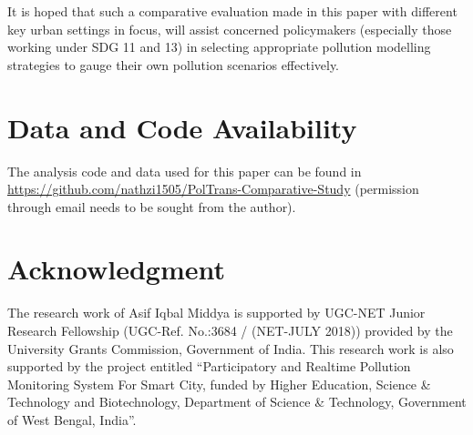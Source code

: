 \documentclass[10pt,journal]{IEEEtran}
\begin{document}
It is hoped that such a comparative evaluation made in this paper with different key urban settings in focus, will assist concerned policymakers (especially those working under SDG 11 and 13) in selecting appropriate pollution modelling strategies to gauge their own pollution scenarios effectively. 

\section*{Data and Code Availability}
The analysis code and data used for this paper can be found in \url{https://github.com/nathzi1505/PolTrans-Comparative-Study} (permission through email needs to be sought from the author).

\section*{Acknowledgment}
The research work of Asif Iqbal Middya is supported by UGC-NET Junior Research Fellowship (UGC-Ref. No.:3684 / (NET-JULY 2018)) provided by the University Grants Commission, Government of India. This research work is also supported by the project entitled ``Participatory and Realtime Pollution Monitoring System For Smart City, funded by Higher Education, Science \& Technology and Biotechnology, Department of Science \& Technology, Government of West Bengal, India''.  

\ifCLASSOPTIONcaptionsoff
  \newpage
\fi



\end{document}

